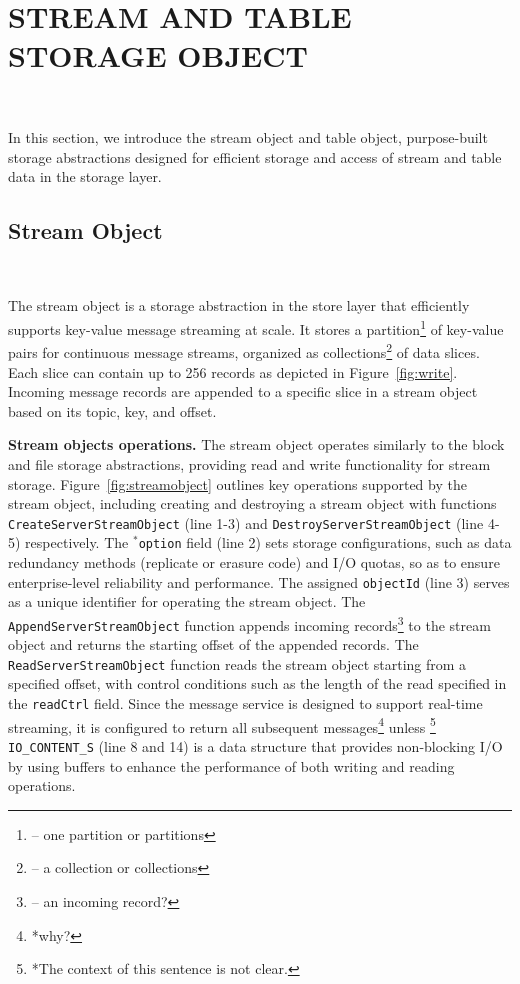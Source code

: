 \section{STREAM AND TABLE STORAGE OBJECT} 
~\label{sec:datagen}

In this section, we introduce the stream object and table object, purpose-built storage abstractions designed for efficient storage and access of stream and table data in the storage layer.


\subsection{Stream Object}~\label{subsec:streamobject}

The stream object is a storage abstraction in the store layer that efficiently supports key-value message streaming at scale. It stores a partition\footnote{-- one partition or partitions} of key-value pairs for continuous message streams, organized as collections\footnote{-- a collection or collections} of data slices. Each slice can contain up to 256 records as depicted in Figure~\ref{fig:write}. Incoming message records are appended  to a specific slice in a stream object based on its topic, key, and offset.

\noindent \textbf{Stream objects operations.} The stream object operates similarly to the block and file storage abstractions, providing read and write functionality for stream storage. Figure~\ref{fig:streamobject} outlines key operations supported by the stream object, including creating and destroying a stream object with  functions \texttt{CreateServerStreamObject} (line 1-3) and \texttt{DestroyServerStreamObject} (line 4-5) respectively. The \texttt{$^*$option} field (line 2) sets storage configurations, such as data redundancy methods (replicate or erasure code) and I/O quotas, so as to ensure enterprise-level reliability and performance. The assigned \texttt{objectId} (line 3) serves as a unique identifier for operating the stream object. The \texttt{AppendServerStreamObject} function appends incoming records\footnote{-- an incoming record?}  to the stream object and returns the starting offset of the appended records. The \texttt{ReadServerStreamObject} function reads the stream object starting from a specified offset, with control conditions such as the length of the read specified in the \texttt{readCtrl} field. 
Since the message service is designed to support real-time streaming, it is configured to return all subsequent messages\footnote{*why?} unless \footnote{*The context of this sentence is not clear.} \texttt{IO\_CONTENT\_S} (line 8 and 14) is a data structure that provides non-blocking I/O by using buffers to enhance the performance of both writing and reading operations.


